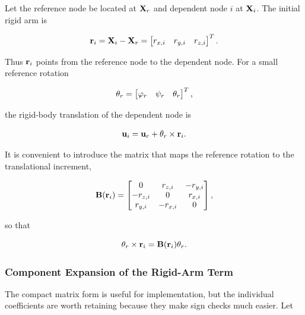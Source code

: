 Let the reference node be located at $\mathbf{X}_r$ and dependent node $i$ at
$\mathbf{X}_i$. The initial rigid arm is

\begin{equation}\label{rbe2-rigid-arm}
    \mathbf{r}_i = \mathbf{X}_i-\mathbf{X}_r
    =
    \begin{bmatrix}
        r_{x,i} & r_{y,i} & r_{z,i}
    \end{bmatrix}^{T}.
\end{equation}

Thus $\mathbf{r}_i$ points from the reference node to the dependent node. For a
small reference rotation

\begin{equation}
    \mathbf{\theta}_r =
    \begin{bmatrix}
        \varphi_r & \psi_r & \theta_r
    \end{bmatrix}^{T},
\end{equation}

the rigid-body translation of the dependent node is

\begin{equation}\label{rbe2-rigid-motion}
    \mathbf{u}_i = \mathbf{u}_r + \mathbf{\theta}_r\times\mathbf{r}_i.
\end{equation}

It is convenient to introduce the matrix that maps the reference rotation to the
translational increment,

\begin{equation}\label{rbe2-B-matrix}
    \mathbf{B}(\mathbf{r}_i)=
    \begin{bmatrix}
        0        & r_{z,i}  & -r_{y,i} \\
        -r_{z,i}& 0         & r_{x,i} \\
        r_{y,i} & -r_{x,i}  & 0
    \end{bmatrix},
\end{equation}

so that

\begin{equation}
    \mathbf{\theta}_r\times\mathbf{r}_i
    = \mathbf{B}(\mathbf{r}_i)\mathbf{\theta}_r.
\end{equation}


\subsubsection{Component Expansion of the Rigid-Arm Term}

The compact matrix form is useful for implementation, but the individual
coefficients are worth retaining because they make sign checks much easier. Let

